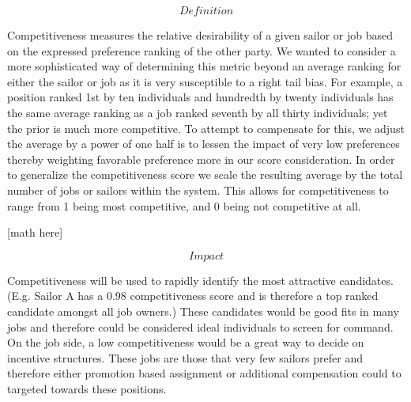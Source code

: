 \[\textit{Definition}\]

Competitiveness measures the relative desirability of a given sailor or job based on the expressed preference ranking of the other party. We wanted to consider a more sophisticated way of determining this metric beyond an average ranking for either the sailor or job as it is very susceptible to a right tail bias.  For example, a position ranked 1st by ten individuals and hundredth by twenty individuals has the same average ranking as a job ranked seventh by all thirty individuals; yet the prior is much more competitive. To attempt to compensate for this, we adjust the average by a power of one half is to lessen the impact of very low preferences thereby weighting favorable preference more in our score consideration. 
 In order to generalize the competitiveness score we scale the resulting average by the total number of jobs or sailors within the system. This allows for competitiveness to range from 1 being most competitive, and 0 being not competitive at all.


[math here]


\[\textit{Impact}\]

Competitiveness will be used to rapidly identify the most attractive candidates. (E.g. Sailor A has a 0.98 competitiveness score and is therefore a top ranked candidate amongst all job owners.) These candidates would be good fits in many jobs and therefore could be considered ideal individuals to screen for command. On the job side, a low competitiveness would be a great way to decide on incentive structures. These jobs are those that very few sailors prefer and therefore either promotion based assignment or additional compensation could to targeted towards these positions. 